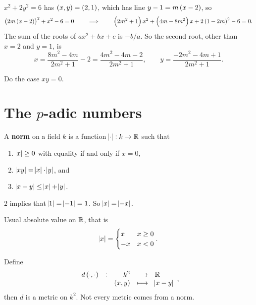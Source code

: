 \begin{example}
$ x^2 + 2y^2 = 6 $ has $ \br{x, y} = \br{2, 1} $, which has line $ y - 1 = m\br{x - 2} $, so
$$ \br{2m\br{x - 2}}^2 + x^2 - 6 = 0 \qquad \implies \qquad \br{2m^2 + 1}x^2 + \br{4m - 8m^2}x + 2\br{1 - 2m}^2 - 6 = 0. $$
The sum of the roots of $ ax^2 + bx + c $ is $ -b / a $. So the second root, other than $ x = 2 $ and $ y = 1 $, is
$$ x = \dfrac{8m^2 - 4m}{2m^2 + 1} - 2 = \dfrac{4m^2 - 4m - 2}{2m^2 + 1}, \qquad y = \dfrac{-2m^2 - 4m + 1}{2m^2 + 1}. $$
\end{example}

\begin{exercise}
Do the case $ xy = 0 $.
\end{exercise}

\pagebreak

\section{The \texorpdfstring{$ p $}{p}-adic numbers}


\begin{definition}
A \textbf{norm} on a field $ k $ is a function $ \abs{\cdot} : k \to \mathbb{R} $ such that
\begin{enumerate}
\item $ \abs{x} \ge 0 $ with equality if and only if $ x = 0 $,
\item $ \abs{xy} = \abs{x} \cdot \abs{y} $, and
\item $ \abs{x + y} \le \abs{x} + \abs{y} $.
\end{enumerate}
\end{definition}

$ 2 $ implies that $ \abs{1} = \abs{-1} = 1 $. So $ \abs{x} = \abs{-x} $.

\begin{example*}
Usual absolute value on $ \mathbb{R} $, that is
$$ \abs{x} =
\begin{cases}
x & x \ge 0 \\
-x & x < 0 \\
\end{cases}.
$$
\end{example*}

\begin{remark}
Define
$$ \function[d\br{\cdot, \cdot}]{k^2}{\RR}{\br{x, y}}{\abs{x - y}}, $$
then $ d $ is a metric on $ k^2 $. Not every metric comes from a norm.
\end{remark}


